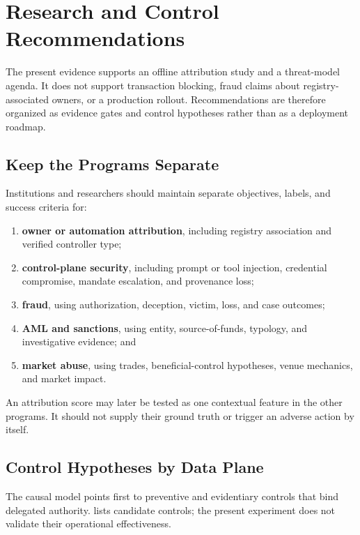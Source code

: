 
\section{Research and Control Recommendations}\label{sec:recommendations}

The present evidence supports an offline attribution study and a threat-model
agenda.  It does not support transaction blocking, fraud claims about
registry-associated owners, or a production rollout.  Recommendations are
therefore organized as evidence gates and control hypotheses rather than as a
deployment roadmap.

\subsection{Keep the Programs Separate}

Institutions and researchers should maintain separate objectives, labels, and
success criteria for:
\begin{enumerate}[leftmargin=*,nosep]
  \item \textbf{owner or automation attribution}, including registry
    association and verified controller type;
  \item \textbf{control-plane security}, including prompt or tool injection,
    credential compromise, mandate escalation, and provenance loss;
  \item \textbf{fraud}, using authorization, deception, victim, loss, and case
    outcomes;
  \item \textbf{AML and sanctions}, using entity, source-of-funds, typology, and
    investigative evidence; and
  \item \textbf{market abuse}, using trades, beneficial-control hypotheses,
    venue mechanics, and market impact.
\end{enumerate}

An attribution score may later be tested as one contextual feature in the other
programs.  It should not supply their ground truth or trigger an adverse action
by itself.

\subsection{Control Hypotheses by Data Plane}

The causal model points first to preventive and evidentiary controls that bind
delegated authority.   lists candidate controls;
the present experiment does not validate their operational effectiveness.


